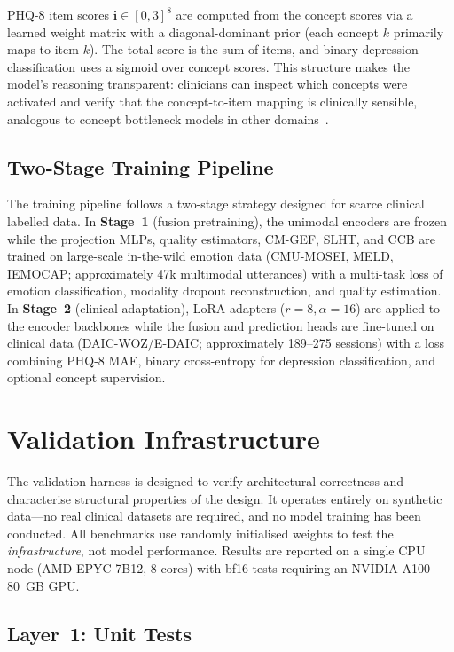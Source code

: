 \documentclass{article}
\begin{document}
PHQ-8 item scores $\mathbf{i} \in [0, 3]^8$ are computed from the concept scores via a
learned weight matrix with a diagonal-dominant prior (each concept $k$ primarily maps to
item $k$). The total score is the sum of items, and binary depression classification uses
a sigmoid over concept scores. This structure makes the model's reasoning transparent:
clinicians can inspect which concepts were activated and verify that the concept-to-item
mapping is clinically sensible, analogous to concept bottleneck models in other
domains~\cite{koh2020concept}.

\subsection{Two-Stage Training Pipeline}

The training pipeline follows a two-stage strategy designed for scarce clinical labelled
data. In \textbf{Stage~1} (fusion pretraining), the unimodal encoders are frozen while
the projection MLPs, quality estimators, CM-GEF, SLHT, and CCB are trained on large-scale
in-the-wild emotion data (CMU-MOSEI, MELD, IEMOCAP; approximately 47k multimodal
utterances) with a multi-task loss of emotion classification, modality dropout
reconstruction, and quality estimation. In \textbf{Stage~2} (clinical adaptation), LoRA
adapters ($r=8, \alpha=16$) are applied to the encoder backbones while the fusion and
prediction heads are fine-tuned on clinical data (DAIC-WOZ/E-DAIC; approximately 189--275
sessions) with a loss combining PHQ-8 MAE, binary cross-entropy for depression
classification, and optional concept supervision.


\section{Validation Infrastructure}
\label{sec:validation}

The validation harness is designed to verify architectural correctness and characterise
structural properties of the design. It operates entirely on synthetic data---no real
clinical datasets are required, and no model training has been conducted. All benchmarks
use randomly initialised weights to test the \emph{infrastructure}, not model performance.
Results are reported on a single CPU node (AMD EPYC 7B12, 8 cores) with bf16 tests
requiring an NVIDIA A100 80~GB GPU.

\subsection{Layer~1: Unit Tests}
\end{document}
